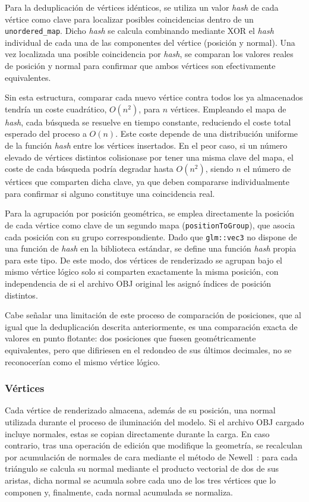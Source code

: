 Para la deduplicación de vértices idénticos, se utiliza un valor \textit{hash} de cada vértice como clave para localizar posibles coincidencias dentro de un \texttt{unordered\_map}. Dicho \textit{hash} se calcula combinando mediante XOR el \textit{hash} individual de cada una de las componentes del vértice (posición y normal). Una vez localizada una posible coincidencia por \textit{hash}, se comparan los valores reales de posición y normal para confirmar que ambos vértices son efectivamente equivalentes.

Sin esta estructura, comparar cada nuevo vértice contra todos los ya almacenados tendría un coste cuadrático, $O(n^2)$, para $n$ vértices. Empleando el mapa de \textit{hash}, cada búsqueda se resuelve en tiempo constante, reduciendo el coste total esperado del proceso a $O(n)$. Este coste depende de una distribución uniforme de la función \textit{hash} entre los vértices insertados. En el peor caso, si un número elevado de vértices distintos colisionase por tener una misma clave del mapa, el coste de cada búsqueda podría degradar hasta $O(n^2)$, siendo $n$ el número de vértices que comparten dicha clave, ya que deben compararse individualmente para confirmar si alguno constituye una coincidencia real.

Para la agrupación por posición geométrica, se emplea directamente la posición de cada vértice como clave de un segundo mapa (\texttt{positionToGroup}), que asocia cada posición con su grupo correspondiente. Dado que \texttt{glm::vec3} no dispone de una función de \textit{hash} en la biblioteca estándar, se define una función \textit{hash} propia para este tipo. De este modo, dos vértices de renderizado se agrupan bajo el mismo vértice lógico solo si comparten exactamente la misma posición, con independencia de si el archivo OBJ original les asignó índices de posición distintos.

Cabe señalar una limitación de este proceso de comparación de posiciones, que al igual que la deduplicación descrita anteriormente, es una comparación exacta de valores en punto flotante: dos posiciones que fuesen geométricamente equivalentes, pero que difiriesen en el redondeo de sus últimos decimales, no se reconocerían como el mismo vértice lógico.

\subsubsection{Vértices}\label{sec:vertices}

Cada vértice de renderizado almacena, además de su posición, una normal utilizada durante el proceso de iluminación del modelo. Si el archivo OBJ cargado incluye normales, estas se copian directamente durante la carga. En caso contrario, tras una operación de edición que modifique la geometría, se recalculan por acumulación de normales de cara mediante el método de Newell~\cite{newell-method}: para cada triángulo se calcula su normal mediante el producto vectorial de dos de sus aristas, dicha normal se acumula sobre cada uno de los tres vértices que lo componen y, finalmente, cada normal acumulada se normaliza.

